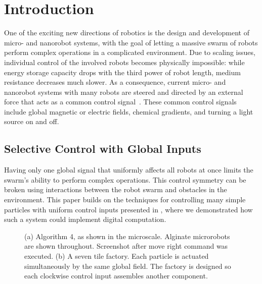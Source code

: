 \section{Introduction}\label{sec:Intro}

One of the exciting new directions of robotics is the design and development
of micro- and nanorobot systems, with the goal of letting a massive swarm of robots
perform complex operations in a complicated environment. Due to scaling 
issues, individual control of the involved robots becomes physically impossible:
while energy storage capacity drops with the third power of robot length,
medium resistance decreases much slower. As a consequence,
current micro- and nanorobot systems with many robots are steered and
directed by an external force that acts as a common control signal~\cite{Donald2013,Chiang2011,Hsi-Wen2012,Diller2013,Jing2013,Ou2013,Lanauze2013}.
These common control signals include global magnetic or electric fields,
chemical gradients, and turning a light source on and off.  

 \subsection{Selective Control with Global Inputs}
Having only one global signal that uniformly affects all robots at once
limits the swarm's ability to perform complex operations.
This control symmetry can be broken using interactions between the robot swarm
and obstacles in the environment. 
This paper builds on the techniques for controlling many simple particles with uniform control inputs presented in \cite{Becker2013f,Becker2014,Becker2014a}, where
we demonstrated how such a system could  implement digital computation.


\begin{figure}
\centering
{} 
\newline
{}
\caption{(a) 
Algorithm 4, as shown in the microscale. Alginate microrobots are shown throughout. Screenshot after move right command was executed. 
 (b) A seven tile factory. Each particle is actuated simultaneously by the same global field. The factory is designed so each clockwise control input assembles another component.}
\label{fig:1ab} 
\end{figure}



